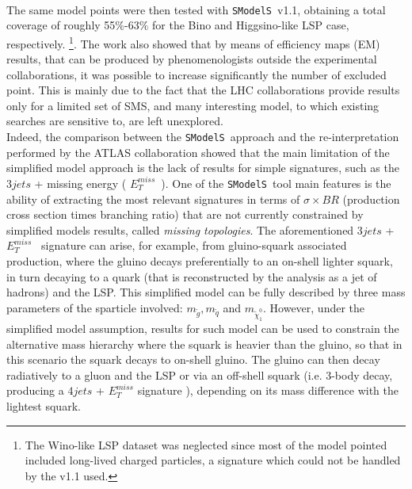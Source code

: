 \documentclass[preprint,number,sort&compress,twocolumn,3p]{elsstyarticle}
\newcommand{\MET}{{ $E_T ^{miss}$}}
\newcommand{\SMO}{\texttt{SModelS\xspace}}
\begin{document}
%
\\
The same model points were then tested with \SMO~v1.1\cite{Ambrogi:2017neo}, obtaining a total coverage of roughly 55$\%$-63$\%$ for the Bino and Higgsino-like LSP case, respectively. \footnote{The Wino-like LSP dataset was neglected since most of the model pointed included long-lived charged particles, a signature which could not be handled by the v1.1 used.}. The work also showed that by means of efficiency maps (EM) results, that can be produced by phenomenologists outside the experimental collaborations, it was possible to increase significantly the number of excluded point. This is mainly due to the fact that the LHC collaborations provide results only for a limited set of SMS, and many interesting model, to which existing searches are sensitive to, are left unexplored.
\\
Indeed, the comparison between the \SMO~approach and the re-interpretation performed by the ATLAS collaboration showed  that the main limitation of the simplified model approach is the lack of results for simple signatures, such as the $3jets$ + missing energy (\MET~). One of the \SMO~tool main features is the ability of extracting the most relevant signatures in terms of $\sigma \times BR$ (production cross section  times branching ratio) that are not currently constrained by simplified models results, called \textit{missing topologies}. The aforementioned $3jets$ +\MET~ signature can arise, for example, from gluino-squark associated production, where the gluino decays preferentially to an on-shell lighter squark, in turn decaying to a quark (that is reconstructed by the analysis as a jet of hadrons) and the LSP. This simplified model can be fully described by three mass parameters of the sparticle involved: $m_{\tilde g}, m_{\tilde q}$ and $m_{\tilde \chi _1 ^0}$. However, under the simplified model assumption, results for such model can be used to constrain the alternative mass hierarchy where the squark is heavier than the gluino, so that in this scenario the squark decays to on-shell gluino. The gluino can then decay radiatively to a gluon and the LSP or via an off-shell squark (i.e. 3-body decay, producing a $4jets$ + $E_T ^{miss}$ signature ), depending on its mass difference with the lightest squark. 
\end{document}
